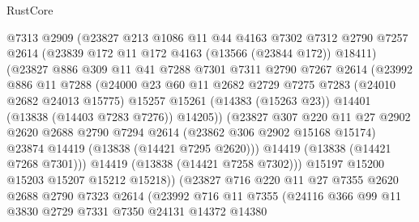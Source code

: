 \begin{lexlean}{RustCore}
\begin{coremodule}
                @7313
                @2909
                (@23827
                  @213
                  @1086
                  @11
                  @44
                  @4163
                  @7302
                  @7312
                  @2790
                  @7257
                  @2614
                  (@23839 @172 @11 @172 @4163 (@13566 (@23844 @172)) @18411)
                  (@23827
                    @886
                    @309
                    @11
                    @41
                    @7288
                    @7301
                    @7311
                    @2790
                    @7267
                    @2614
                    (@23992
                      @886
                      @11
                      @7288
                      (@24000
                        @23
                        @60
                        @11
                        @2682
                        @2729
                        @7275
                        @7283
                        (@24010 @2682 @24013 @15775)
                        @15257
                        @15261
                        (@14383 (@15263 @23))
                        @14401
                        (@13838 (@14403 @7283 @7276))
                        @14205))
                    (@23827
                      @307
                      @220
                      @11
                      @27
                      @2902
                      @2620
                      @2688
                      @2790
                      @7294
                      @2614
                      (@23862 @306 @2902 @15168 @15174)
                      @23874
                      @14419
                      (@13838 (@14421 @7295 @2620)))
                    @14419
                    (@13838 (@14421 @7268 @7301)))
                  @14419
                  (@13838 (@14421 @7258 @7302)))
                @15197
                @15200
                @15203
                @15207
                @15212
                @15218))
            (@23827
              @716
              @220
              @11
              @27
              @7355
              @2620
              @2688
              @2790
              @7323
              @2614
              (@23992
                @716
                @11
                @7355
                (@24116
                  @366
                  @99
                  @11
                  @3830
                  @2729
                  @7331
                  @7350
                  @24131
                  @14372
                  @14380

\end{coremodule}
\end{lexlean}
